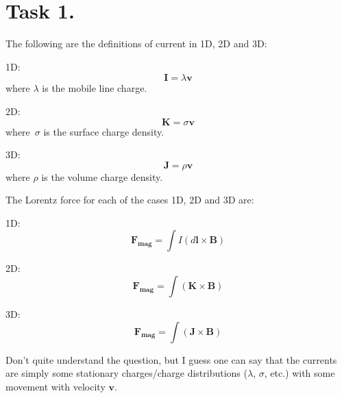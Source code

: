 \documentclass[a4paper,11pt]{article}
\begin{document}


\section*{Task 1.}
\begin{alphalist}
    \item The following are the definitions of current in 1D, 2D and 3D:
    \begin{romanlist}
        \item 1D:
            \[
                \mathbf{I} = \lambda \mathbf{v}
            \]
            where $\lambda$ is the mobile line charge.
        \item 2D:
            \[
                \mathbf{K} = \sigma \mathbf{v}
            \]
            where $\sigma$ is the surface charge density.
        \item 3D:
            \[
                \mathbf{J} = \rho \mathbf{v}
            \]
            where $\rho$ is the volume charge density.
    \end{romanlist} 

    \item The Lorentz force for each of the cases 1D, 2D and 3D are:
    \begin{romanlist}
        \item 1D:
            \[
                \mathbf{F_{\text{mag}}} = \int I(d\mathbf{l} \times \mathbf{B})
            \]
        \item 2D:
            \[
                \mathbf{F_{\text{mag}}} = \int (\mathbf{K} \times \mathbf{B})
            \]
        \item 3D:
            \[
                \mathbf{F_{\text{mag}}} = \int (\mathbf{J} \times \mathbf{B})
            \]
    \end{romanlist}

    \item Don't quite understand the question, but I guess one can say that the currents are simply some stationary charges/charge distributions ($\lambda$, $\sigma$, etc.) 
        with some movement with velocity $\mathbf{v}$.
\end{alphalist}
\end{document}
